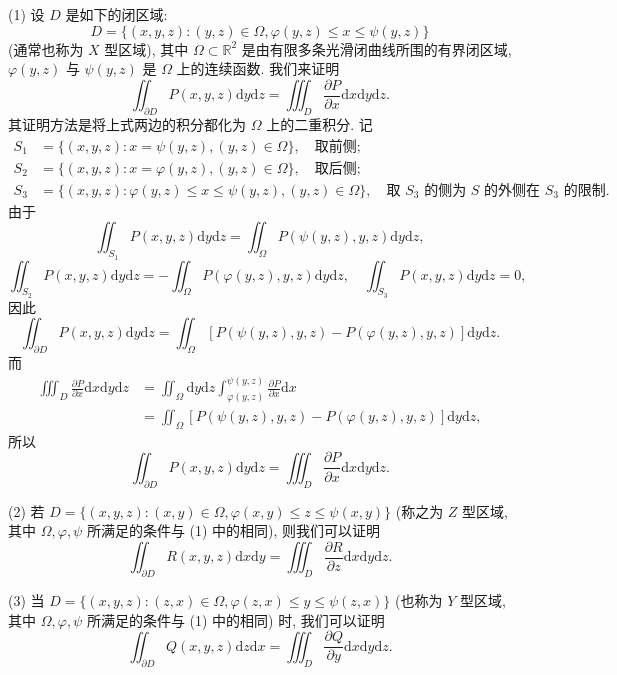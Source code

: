 \documentclass[UTF8,12pt,a4paper,fontset=fandol]{ctexart}
\begin{document}
(1) 设 $D$ 是如下的闭区域:
\[
  D=\{(x,y,z):(y,z)\in\Omega,\varphi(y,z)\leqslant x\leqslant\psi(y,z)\}
\]
(通常也称为 $X$ 型区域), 其中 $\Omega\subset\mathbb R^2$ 是由有限多条光滑闭曲线所围的有界闭区域, $\varphi(y,z)$ 与 $\psi(y,z)$ 是 $\Omega$ 上的连续函数. 我们来证明
\[
  \iint_{\partial D}P(x,y,z)\mathrm dy\mathrm dz
  =\iiint_D\frac{\partial P}{\partial x}\mathrm dx\mathrm dy\mathrm dz.
\]
其证明方法是将上式两边的积分都化为 $\Omega$ 上的二重积分. 记
\[
\begin{aligned}
  S_1&=\{(x,y,z):x=\psi(y,z),(y,z)\in\Omega\},\quad \text{取前侧};\\
  S_2&=\{(x,y,z):x=\varphi(y,z),(y,z)\in\Omega\},\quad \text{取后侧};\\
  S_3&=\{(x,y,z):\varphi(y,z)\leqslant x\leqslant\psi(y,z),(y,z)\in\Omega\},
    \quad \text{取 $S_3$ 的侧为 $S$ 的外侧在 $S_3$ 的限制}.
\end{aligned}
\]
由于
\[
  \iint_{S_1}P(x,y,z)\mathrm dy\mathrm dz
  =\iint_\Omega P(\psi(y,z),y,z)\mathrm dy\mathrm dz,
\]
\[
  \iint_{S_2}P(x,y,z)\mathrm dy\mathrm dz
  =-\iint_\Omega P(\varphi(y,z),y,z)\mathrm dy\mathrm dz,\quad
  \iint_{S_3}P(x,y,z)\mathrm dy\mathrm dz=0,
\]
因此
\[
  \iint_{\partial D}P(x,y,z)\mathrm dy\mathrm dz
  =\iint_\Omega[P(\psi(y,z),y,z)-P(\varphi(y,z),y,z)]\mathrm dy\mathrm dz.
\]
而
\[
\begin{aligned}
  \iiint_D\frac{\partial P}{\partial x}\mathrm dx\mathrm dy\mathrm dz
  &=\iint_\Omega\mathrm dy\mathrm dz
    \int_{\varphi(y,z)}^{\psi(y,z)}\frac{\partial P}{\partial x}\mathrm dx\\
  &=\iint_\Omega[P(\psi(y,z),y,z)-P(\varphi(y,z),y,z)]\mathrm dy\mathrm dz,
\end{aligned}
\]
所以
\[
  \iint_{\partial D}P(x,y,z)\mathrm dy\mathrm dz
  =\iiint_D\frac{\partial P}{\partial x}\mathrm dx\mathrm dy\mathrm dz.
\]

(2) 若 $D=\{(x,y,z):(x,y)\in\Omega,\varphi(x,y)\leqslant z\leqslant\psi(x,y)\}$ (称之为 $Z$ 型区域, 其中 $\Omega,\varphi,\psi$ 所满足的条件与 (1) 中的相同), 则我们可以证明
\[
  \iint_{\partial D}R(x,y,z)\mathrm dx\mathrm dy
  =\iiint_D\frac{\partial R}{\partial z}\mathrm dx\mathrm dy\mathrm dz.
\]

(3) 当 $D=\{(x,y,z):(z,x)\in\Omega,\varphi(z,x)\leqslant y\leqslant\psi(z,x)\}$ (也称为 $Y$ 型区域, 其中 $\Omega,\varphi,\psi$ 所满足的条件与 (1) 中的相同) 时, 我们可以证明
\[
  \iint_{\partial D}Q(x,y,z)\mathrm dz\mathrm dx
  =\iiint_D\frac{\partial Q}{\partial y}\mathrm dx\mathrm dy\mathrm dz.
\]
\end{document}
